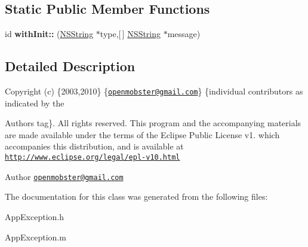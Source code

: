 \subsection*{\-Static \-Public \-Member \-Functions}
\begin{DoxyCompactItemize}
\item 
\hypertarget{interface_app_exception_ad7ed8837d108097da57ee6d75b98fd22}{
id {\bfseries with\-Init\-::} (\hyperlink{class_n_s_string}{\-N\-S\-String} $\ast$type,\mbox{[}$\,$\mbox{]} \hyperlink{class_n_s_string}{\-N\-S\-String} $\ast$message)}
\label{interface_app_exception_ad7ed8837d108097da57ee6d75b98fd22}

\end{DoxyCompactItemize}


\subsection{\-Detailed \-Description}
\-Copyright (c) \{2003,2010\} \{\href{mailto:openmobster@gmail.com}{\tt openmobster@gmail.\-com}\} \{individual contributors as indicated by the \begin{DoxyAuthor}{\-Authors}
tag\}. \-All rights reserved. \-This program and the accompanying materials are made available under the terms of the \-Eclipse \-Public \-License v1. which accompanies this distribution, and is available at \href{http://www.eclipse.org/legal/epl-v10.html}{\tt http\-://www.\-eclipse.\-org/legal/epl-\/v10.\-html}
\end{DoxyAuthor}
\begin{DoxyAuthor}{\-Author}
\href{mailto:openmobster@gmail.com}{\tt openmobster@gmail.\-com} 
\end{DoxyAuthor}


\-The documentation for this class was generated from the following files\-:\begin{DoxyCompactItemize}
\item 
\-App\-Exception.\-h\item 
\-App\-Exception.\-m\end{DoxyCompactItemize}

